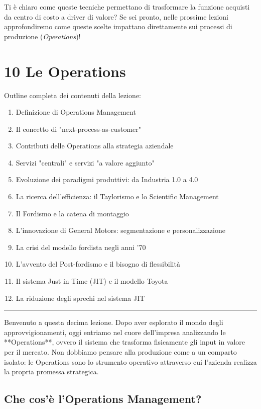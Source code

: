 \documentclass[a4paper,10pt]{article}
\begin{document}
Ti è chiaro come queste tecniche permettano di trasformare la funzione acquisti da centro di costo a driver di valore? Se sei pronto, nelle prossime lezioni approfondiremo come queste scelte impattano direttamente sui processi di produzione (\textit{Operations})!
\section*{10 Le Operations}

Outline completa dei contenuti della lezione:
{\small
\begin{enumerate}
\item Definizione di Operations Management
\item Il concetto di "next-process-as-customer"
\item Contributi delle Operations alla strategia aziendale
\item Servizi "centrali" e servizi "a valore aggiunto"
\item Evoluzione dei paradigmi produttivi: da Industria 1.0 a 4.0
\item La ricerca dell'efficienza: il Taylorismo e lo Scientific Management
\item Il Fordismo e la catena di montaggio
\item L'innovazione di General Motors: segmentazione e personalizzazione
\item La crisi del modello fordista negli anni '70
\item L'avvento del Post-fordismo e il bisogno di flessibilità
\item Il sistema Just in Time (JIT) e il modello Toyota
\item La riduzione degli sprechi nel sistema JIT
\end{enumerate}
}
\hrule
\vspace{0.5cm}

Benvenuto a questa decima lezione. Dopo aver esplorato il mondo degli approvvigionamenti, oggi entriamo nel cuore dell'impresa analizzando le **Operations**, ovvero il sistema che trasforma fisicamente gli input in valore per il mercato. Non dobbiamo pensare alla produzione come a un comparto isolato: le Operations sono lo strumento operativo attraverso cui l'azienda realizza la propria promessa strategica.

\subsection*{Che cos'è l'Operations Management?}
\end{document}
